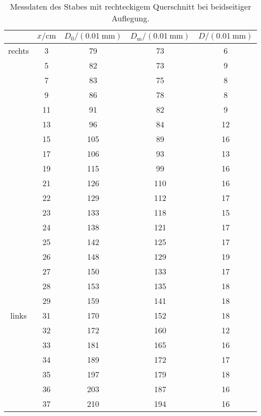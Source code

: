 \begin{table}[H]
    \centering
    \caption{Messdaten des Stabes mit rechteckigem Querschnitt bei beidseitiger Auflegung.}
    \label{tab:messdaten_rechteck_beidseitig}
    \begin{tabular}[]{S S[table-format = 2.0] S S S[table-format = 2.0]}
        \toprule
        {} & {$x / \unit{\centi\meter}$} & {$D_0 / (\qty{0.01}{\milli\meter})$} & {$D_\text{m} / (\qty{0.01}{\milli\meter})$} & {$D / (\qty{0.01}{\milli\meter})$} \\
        \midrule
        {rechts} &  3 &  79 &  73 &  6 \\
                 &  5 &  82 &  73 &  9 \\
                 &  7 &  83 &  75 &  8 \\
                 &  9 &  86 &  78 &  8 \\
                 & 11 &  91 &  82 &  9 \\
                 & 13 &  96 &  84 & 12 \\
                 & 15 & 105 &  89 & 16 \\
                 & 17 & 106 &  93 & 13 \\
                 & 19 & 115 &  99 & 16 \\
                 & 21 & 126 & 110 & 16 \\
                 & 22 & 129 & 112 & 17 \\
                 & 23 & 133 & 118 & 15 \\
                 & 24 & 138 & 121 & 17 \\
                 & 25 & 142 & 125 & 17 \\
                 & 26 & 148 & 129 & 19 \\
                 & 27 & 150 & 133 & 17 \\
                 & 28 & 153 & 135 & 18 \\
                 & 29 & 159 & 141 & 18 \\
        \midrule
         {links} & 31 & 170 & 152 & 18 \\
                 & 32 & 172 & 160 & 12 \\
                 & 33 & 181 & 165 & 16 \\
                 & 34 & 189 & 172 & 17 \\
                 & 35 & 197 & 179 & 18 \\
                 & 36 & 203 & 187 & 16 \\
                 & 37 & 210 & 194 & 16 \\

\end{tabular}
\end{table}
